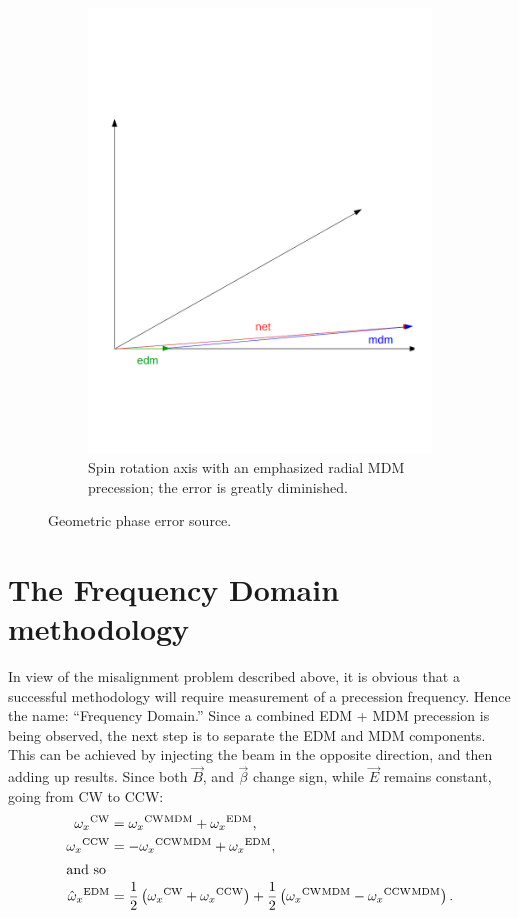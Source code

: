 \documentclass{article}
\newcommand{\w}{\omega}
\newcommand{\MDM}{{}^\mathrm{MDM}}
\newcommand{\EDM}{{}^\mathrm{EDM}}
\newcommand{\CW}{{}^\mathrm{CW}}
\newcommand{\CCW}{{}^\mathrm{CCW}}
\begin{document}
\begin{figure}
\begin{subfigure}[b]{.5\textwidth}
    \includegraphics[width=\textwidth]{img/geometric_phase_2}
    \caption{Spin rotation axis with an emphasized radial MDM precession; the error is greatly diminished.}
  \end{subfigure}
\caption{Geometric phase error source.\label{fig:GeomPhase}}
\end{figure}

\section{The Frequency Domain methodology}
In view of the misalignment problem described above, it is obvious that a successful methodology will require measurement of a precession frequency. Hence the name: ``Frequency Domain.'' Since a combined EDM + MDM precession is being observed, the next step is to separate the EDM and MDM components. This can be achieved by injecting the beam in the opposite direction, and then adding up results. Since both $\vec B$, and $\vec\beta$ change sign, while $\vec E$ remains constant, going from CW to CCW:
\begin{align}
  \w_x\CW &= \w_x\CW\MDM + \w_x\EDM, \\
  \w_x\CCW &= -\w_x\CCW\MDM + \w_x\EDM, \\
  \shortintertext{and so}
  \hat\w_x\EDM &= \frac12\bkt{\w_x\CW + \w_x\CCW} + \frac12\bkt{\w_x\CW\MDM - \w_x\CCW\MDM}.
\end{align}
\end{document}
